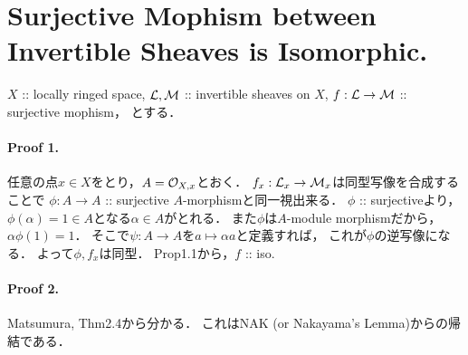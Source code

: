 \documentclass[a4paper]{jsarticle}
\begin{document}


\section{Surjective Mophism between Invertible Sheaves is Isomorphic.} %
    $X$ :: locally ringed space,
    $\mathcal{L}, \mathcal{M}$ :: invertible sheaves on $X$,
    $f: \mathcal{L} \to \mathcal{M}$ :: surjective mophism，
    とする．
    
    \paragraph{Proof 1.}
    任意の点$x \in X$をとり，$A=\mathcal{O}_{X,x}$とおく．
    $f_x: \mathcal{L}_x \to \mathcal{M}_x$は同型写像を合成することで
    $\phi: A \to A$ :: surjective $A$-morphismと同一視出来る．
    $\phi$ :: surjectiveより，
    $\phi(\alpha)=1 \in A$となる$\alpha \in A$がとれる．
    また$\phi$は$A$-module morphismだから，$\alpha \phi(1)=1$．
    そこで$\psi: A \to A$を$a \mapsto \alpha a$と定義すれば，
    これが$\phi$の逆写像になる．
    よって$\phi, f_x$は同型．
    Prop1.1から，$f$ :: iso.

    \paragraph{Proof 2.}
    Matsumura, Thm2.4から分かる．
    これはNAK (or Nakayama's Lemma)からの帰結である．
\end{document}
